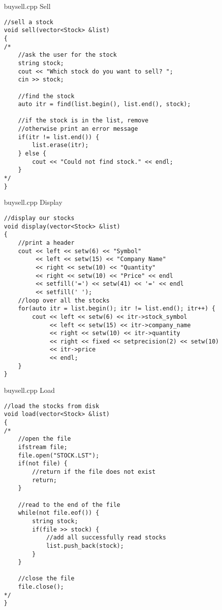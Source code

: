 \documentclass[]{beamer}
\begin{document}
\begin{frame}[fragile]{buysell.cpp Sell}
\begin{adjustbox}{max totalheight=0.90\textheight}
\begin{BVerbatim}
//sell a stock
void sell(vector<Stock> &list)
{
/*
    //ask the user for the stock
    string stock;
    cout << "Which stock do you want to sell? ";
    cin >> stock;
    
    //find the stock
    auto itr = find(list.begin(), list.end(), stock);

    //if the stock is in the list, remove
    //otherwise print an error message
    if(itr != list.end()) {
        list.erase(itr);
    } else {
        cout << "Could not find stock." << endl;
    }
*/
}
\end{BVerbatim}
\end{adjustbox}
\end{frame}


\begin{frame}[fragile]{buysell.cpp Display}
\begin{adjustbox}{max totalheight=0.90\textheight}
\begin{BVerbatim}
//display our stocks
void display(vector<Stock> &list)
{
    //print a header
    cout << left << setw(6) << "Symbol" 
         << left << setw(15) << "Company Name" 
         << right << setw(10) << "Quantity"
         << right << setw(10) << "Price" << endl
         << setfill('=') << setw(41) << '=' << endl
         << setfill(' ');
    //loop over all the stocks
    for(auto itr = list.begin(); itr != list.end(); itr++) { 
        cout << left << setw(6) << itr->stock_symbol
             << left << setw(15) << itr->company_name
             << right << setw(10) << itr->quantity 
             << right << fixed << setprecision(2) << setw(10)
             << itr->price 
             << endl;
    }
}
\end{BVerbatim}
\end{adjustbox}
\end{frame}

\begin{frame}[fragile]{buysell.cpp Load}
\begin{adjustbox}{max totalheight=0.90\textheight}
\begin{BVerbatim}
//load the stocks from disk
void load(vector<Stock> &list)
{
/*
    //open the file
    ifstream file;
    file.open("STOCK.LST");
    if(not file) {
        //return if the file does not exist
        return;
    }

    //read to the end of the file
    while(not file.eof()) {
        string stock;
        if(file >> stock) {
            //add all successfully read stocks
            list.push_back(stock);
        }
    }

    //close the file
    file.close();
*/
}
\end{BVerbatim}
\end{adjustbox}
\end{frame}
\end{document}
